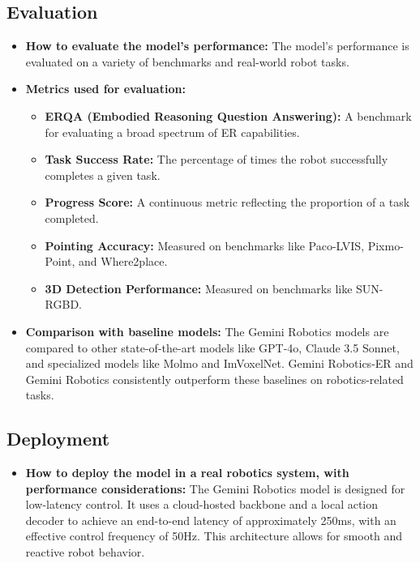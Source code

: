 \documentclass[12pt,a4paper]{article}
\begin{document}
\subsection{Evaluation}

\begin{itemize}
    \item \textbf{How to evaluate the model's performance:} The model's performance is evaluated on a variety of benchmarks and real-world robot tasks.
    
    \item \textbf{Metrics used for evaluation:}
    \begin{itemize}
        \item \textbf{ERQA (Embodied Reasoning Question Answering):} A benchmark for evaluating a broad spectrum of ER capabilities.
        \item \textbf{Task Success Rate:} The percentage of times the robot successfully completes a given task.
        \item \textbf{Progress Score:} A continuous metric reflecting the proportion of a task completed.
        \item \textbf{Pointing Accuracy:} Measured on benchmarks like Paco-LVIS, Pixmo-Point, and Where2place.
        \item \textbf{3D Detection Performance:} Measured on benchmarks like SUN-RGBD.
    \end{itemize}

    \item \textbf{Comparison with baseline models:} The Gemini Robotics models are compared to other state-of-the-art models like GPT-4o, Claude 3.5 Sonnet, and specialized models like Molmo and ImVoxelNet. Gemini Robotics-ER and Gemini Robotics consistently outperform these baselines on robotics-related tasks.
\end{itemize}

\subsection{Deployment}

\begin{itemize}
    \item \textbf{How to deploy the model in a real robotics system, with performance considerations:} The Gemini Robotics model is designed for low-latency control. It uses a cloud-hosted backbone and a local action decoder to achieve an end-to-end latency of approximately 250ms, with an effective control frequency of 50Hz. This architecture allows for smooth and reactive robot behavior.
\end{itemize}
\end{document}
